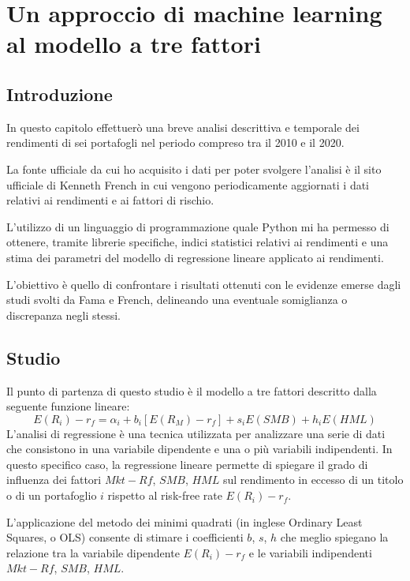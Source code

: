 \chapter{Un approccio di machine learning al modello a tre fattori}
\section{Introduzione}

In questo capitolo effettuerò una breve analisi descrittiva e temporale dei rendimenti di sei portafogli nel periodo compreso tra il 2010 e il 2020. 

La fonte ufficiale da cui ho acquisito i dati per poter svolgere l'analisi è il sito ufficiale di Kenneth French \cite{noauthor_kenneth_nodate} in cui vengono periodicamente aggiornati i dati relativi ai rendimenti e ai fattori di rischio.  

L'utilizzo di un linguaggio di programmazione quale Python mi ha permesso di ottenere, tramite librerie specifiche, indici statistici relativi ai rendimenti e una stima dei parametri del modello di regressione lineare applicato ai rendimenti.

L'obiettivo è quello di confrontare i risultati ottenuti con le evidenze emerse dagli studi svolti da Fama e French, delineando una eventuale somiglianza o discrepanza negli stessi.


\section{Studio}
Il punto di partenza di questo studio è il modello a tre fattori descritto dalla seguente funzione lineare: 
\begin{equation}
E(R_i)-r_f= \alpha_i + b_i[E(R_M)-r_f]+s_iE(SMB)+ h_iE(HML)
\end{equation}
L'analisi di regressione è una tecnica utilizzata per analizzare una serie di dati che consistono in una variabile dipendente e una o più variabili indipendenti. In questo specifico caso, la regressione lineare permette di spiegare il grado di influenza dei fattori $Mkt-Rf$, $SMB$,  $HML$ sul rendimento in eccesso di un titolo o di un portafoglio $i$ rispetto al risk-free rate $E(R_i)-r_f$. 

L'applicazione del metodo dei minimi quadrati (in inglese Ordinary Least Squares, o OLS) consente di stimare i coefficienti $b$, $s$, $h$ che meglio spiegano la relazione tra la variabile dipendente $E(R_i)-r_f$ e le variabili indipendenti $Mkt-Rf$, $SMB$,  $HML$.

